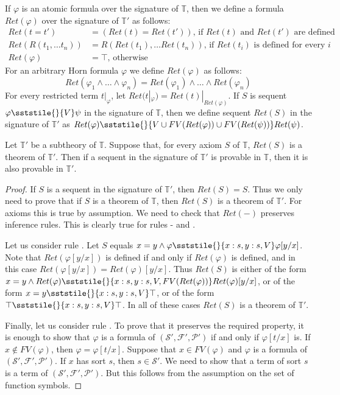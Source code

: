 If $\varphi$ is an atomic formula over the signature of $\mathbb{T}$, then we define a formula $Ret(\varphi)$ over the signature of $\mathbb{T}'$ as follows:
\begin{align*}
Ret(t = t') & = (Ret(t) = Ret(t')) \text{, if $Ret(t)$ and $Ret(t')$ are defined} \\
Ret(R(t_1, \ldots t_n)) & = R(Ret(t_1), \ldots Ret(t_n)) \text{, if $Ret(t_i)$ is defined for every $i$} \\
Ret(\varphi) & = \top \text{, otherwise}
\end{align*}
For an arbitrary Horn formula $\varphi$ we define $Ret(\varphi)$ as follows:
\[ Ret(\varphi_1 \land \ldots \land \varphi_n) = Ret(\varphi_1) \land \ldots \land Ret(\varphi_n) \]
For every restricted term $t|_\varphi$, let $Ret(t|_\varphi) = Ret(t)|_{Ret(\varphi)}$.
If $S$ is sequent $\varphi \sststile{}{V} \psi$ in the signature of $\mathbb{T}$,
then we define sequent $Ret(S)$ in the signature of $\mathbb{T}'$ as $Ret(\varphi) \sststile{}{V \cup FV(Ret(\varphi)) \cup FV(Ret(\psi))} Ret(\psi)$.

\begin{lem}[subtheory]
Let $\mathbb{T}'$ be a subtheory of $\mathbb{T}$.
Suppose that, for every axiom $S$ of $\mathbb{T}$, $Ret(S)$ is a theorem of $\mathbb{T}'$.
Then if a sequent in the signature of $\mathbb{T}'$ is provable in $\mathbb{T}$, then it is also provable in $\mathbb{T}'$.
\end{lem}
\begin{proof}
If $S$ is a sequent in the signature of $\mathbb{T}'$, then $Ret(S) = S$.
Thus we only need to prove that if $S$ is a theorem of $\mathbb{T}$, then $Ret(S)$ is a theorem of $\mathbb{T}'$.
For axioms this is true by assumption.
We need to check that $Ret(-)$ preserves inference rules.
This is clearly true for rules - and .

Let us consider rule .
Let $S$ equals $x = y \land \varphi \sststile{}{x:s,y:s,V} \varphi[y/x]$.
Note that $Ret(\varphi[y/x])$ is defined if and only if $Ret(\varphi)$ is defined, and in this case $Ret(\varphi[y/x]) = Ret(\varphi)[y/x]$.
Thus $Ret(S)$ is either of the form $x = y \land Ret(\varphi) \sststile{}{x:s,y:s,V,FV(Ret(\varphi))} Ret(\varphi)[y/x]$,
or of the form $x = y \sststile{}{x:s,y:s,V} \top$, or of the form $\top \sststile{}{x:s,y:s,V} \top$.
In all of these cases $Ret(S)$ is a theorem of $\mathbb{T}'$.

Finally, let us consider rule .
To prove that it preserves the required property, it is enough to show that $\varphi$ is a formula of $(\mathcal{S}',\mathcal{F}',\mathcal{P}')$ if and only if $\varphi[t/x]$ is.
If $x \notin FV(\varphi)$, then $\varphi = \varphi[t/x]$.
Suppose that $x \in FV(\varphi)$ and $\varphi$ is a formula of $(\mathcal{S}',\mathcal{F}',\mathcal{P}')$.
If $x$ has sort $s$, then $s \in \mathcal{S}'$.
We need to show that a term of sort $s$ is a term of $(\mathcal{S}',\mathcal{F}',\mathcal{P}')$.
But this follows from the assumption on the set of function symbols.
\end{proof}

